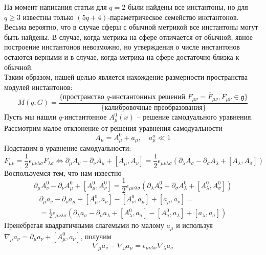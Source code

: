 \documentclass[12pt]{article}
\theoremstyle{definition}
\begin{document}
На момент написания статьи для $q = 2$ были найдены все инстантоны, но для $q\geq 3$ известны только $(5q+4)$-параметрическое семейство инстантонов. Весьма вероятно, что в случае сферы с обычной метрикой все инстантоны могут быть найдены. В случае, когда метрика на сфере отличается от обычной, явное построение инстантонов невозможно, но утверждения о числе инстантонов остаются верными и в случае, когда метрика на сфере достаточно близка к обычной.\\
Таким образом, нашей целью является нахождение размерности пространства модулей инстантонов:
\begin{equation}
    M(q,G)=\frac{\{\text{пространство $q$-инстантонных решений } F_{\mu\nu}=\bar{F}_{\mu\nu},F_{\mu\nu}\in\mathfrak{g}\}}{\{\text{калибровочные преобразования}\}}
\end{equation}
Пусть мы нашли $q$-инстантонное $A^0_\mu(x)$ -- решение самодуального уравнения. Рассмотрим малое отклонение от решения уравнения самодуальности
\begin{equation}
    A_\mu=A^0_\mu+a_\mu,\quad a_\mu^a\ll 1
\end{equation}
Подставим в уравнение самодуальности:
\begin{equation}
    F_{\mu\nu}=\frac{1}{2}\epsilon_{\mu\nu\lambda\sigma}F_{\lambda\sigma}\Leftrightarrow\partial_\mu A_\nu-\partial_\nu A_\mu+[A_\mu,A_\nu]=\frac{1}{2}\epsilon_{\mu\nu\lambda\sigma}(\partial_\lambda A_\sigma-\partial_\sigma A_\lambda+[A_\lambda,A_\sigma])
\end{equation}
Воспользуемся тем, что нам известно
\begin{equation}
    \partial_\mu A^0_\nu-\partial_\nu A^0_\mu+[A^0_\mu,A^0_\nu]=\frac{1}{2}\epsilon_{\mu\nu\lambda\sigma}(\partial_\lambda A^0_\sigma-\partial_\sigma A^0_\lambda+[A^0_\lambda,A^0_\sigma])
\end{equation}
\begin{multline}
    \partial_\mu a_\nu-\partial_\nu a_\mu+[A^0_\mu,a_\nu]-[A^0_\nu,a_\mu]+[a_\mu,a_\nu]=\\=\frac{1}{2}\epsilon_{\mu\nu\lambda\sigma}(\partial_\lambda a_\sigma-\partial_\sigma a_\lambda+[A^0_\lambda,a_\sigma]-[A^0_\sigma,a_\lambda]+[a_\lambda,a_\sigma])
\end{multline}
Пренебрегая квадратичными слагемыми по малому $a_\mu$ и используя $\nabla_\mu a_\nu=\partial_\mu a_\nu+[A^{0}_\mu,a_\nu]$, получим
\begin{equation}
    \nabla_\mu a_\nu-\nabla_\nu a_\mu=\epsilon_{\mu\nu\lambda\sigma}\nabla_\lambda a_\sigma
\end{equation}
\end{document}
